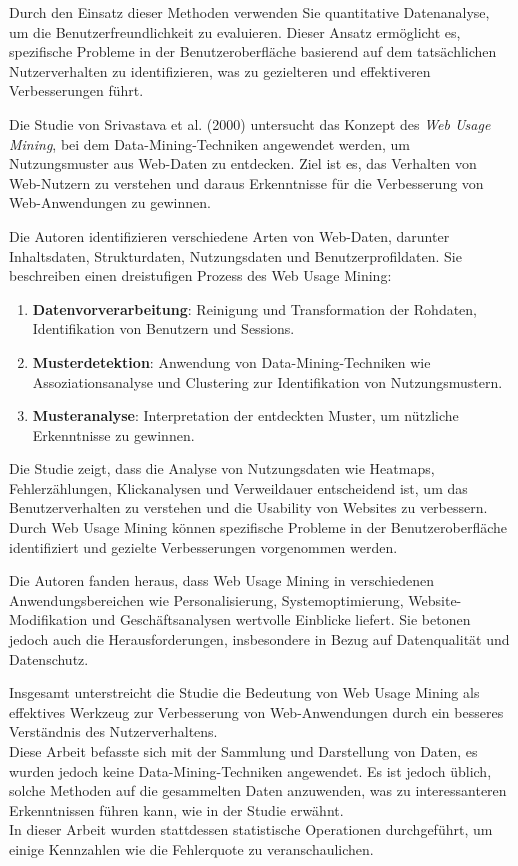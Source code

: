 \documentclass[12pt,oneside]{article}
\begin{document}
Durch den Einsatz dieser Methoden verwenden Sie quantitative Datenanalyse, um die Benutzerfreundlichkeit zu evaluieren. Dieser Ansatz ermöglicht es, spezifische Probleme in der Benutzeroberfläche basierend auf dem tatsächlichen Nutzerverhalten zu identifizieren, was zu gezielteren und effektiveren Verbesserungen führt.


Die Studie von Srivastava et al. (2000)\cite{srivastava2000} untersucht das Konzept des \textit{Web Usage Mining}, bei dem Data-Mining-Techniken angewendet werden, um Nutzungsmuster aus Web-Daten zu entdecken. Ziel ist es, das Verhalten von Web-Nutzern zu verstehen und daraus Erkenntnisse für die Verbesserung von Web-Anwendungen zu gewinnen.

Die Autoren identifizieren verschiedene Arten von Web-Daten, darunter Inhaltsdaten, Strukturdaten, Nutzungsdaten und Benutzerprofildaten. Sie beschreiben einen dreistufigen Prozess des Web Usage Mining:

\begin{enumerate}
 \item \textbf{Datenvorverarbeitung}: Reinigung und Transformation der Rohdaten, Identifikation von Benutzern und Sessions.
\item \textbf{Musterdetektion}: Anwendung von Data-Mining-Techniken wie Assoziationsanalyse und Clustering zur Identifikation von Nutzungsmustern.
 \item \textbf{Musteranalyse}: Interpretation der entdeckten Muster, um nützliche Erkenntnisse zu gewinnen.
 \end{enumerate}

Die Studie zeigt, dass die Analyse von Nutzungsdaten wie Heatmaps, Fehlerzählungen, Klickanalysen und Verweildauer entscheidend ist, um das Benutzerverhalten zu verstehen und die Usability von Websites zu verbessern. Durch Web Usage Mining können spezifische Probleme in der Benutzeroberfläche identifiziert und gezielte Verbesserungen vorgenommen werden.

Die Autoren fanden heraus, dass Web Usage Mining in verschiedenen Anwendungsbereichen wie Personalisierung, Systemoptimierung, Website-Modifikation und Geschäftsanalysen wertvolle Einblicke liefert. Sie betonen jedoch auch die Herausforderungen, insbesondere in Bezug auf Datenqualität und Datenschutz.

Insgesamt unterstreicht die Studie die Bedeutung von Web Usage Mining als effektives Werkzeug zur Verbesserung von Web-Anwendungen durch ein besseres Verständnis des Nutzerverhaltens.\\ 
Diese Arbeit befasste sich mit der Sammlung und Darstellung von Daten, es wurden jedoch keine Data-Mining-Techniken angewendet. Es ist jedoch üblich, solche Methoden auf die gesammelten Daten anzuwenden, was zu interessanteren Erkenntnissen führen kann, wie in der Studie erwähnt.\\
 In dieser Arbeit wurden stattdessen statistische Operationen durchgeführt, um einige Kennzahlen wie die Fehlerquote zu veranschaulichen.
\end{document}
